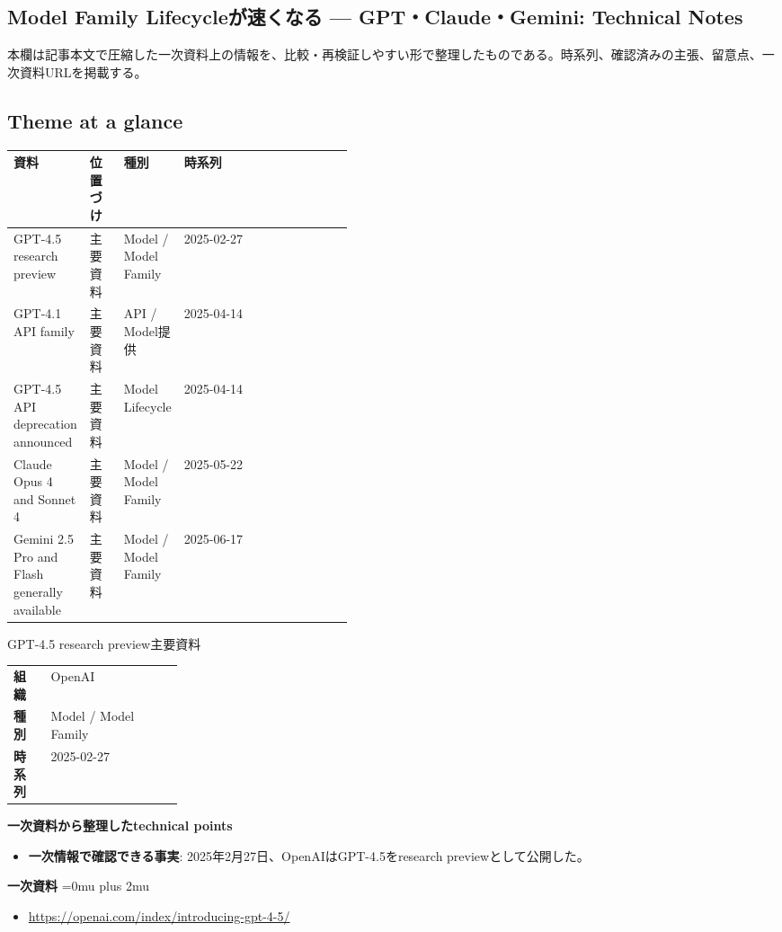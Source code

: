 \subsection*{Model Family Lifecycleが速くなる — GPT・Claude・Gemini: Technical Notes}
本欄は記事本文で圧縮した一次資料上の情報を、比較・再検証しやすい形で整理したものである。時系列、確認済みの主張、留意点、一次資料URLを掲載する。
\medskip
\subsection*{Theme at a glance}
\begin{center}
\footnotesize
\begin{tabularx}{\linewidth}{@{}p{0.20\linewidth}p{0.10\linewidth}p{0.14\linewidth}X@{}}
\toprule
資料 & 位置づけ & 種別 & 時系列 \\
\midrule
GPT-4.5 research preview & 主要資料 & Model / Model Family & 2025-02-27 \\
GPT-4.1 API family & 主要資料 & API / Model提供 & 2025-04-14 \\
GPT-4.5 API deprecation announced & 主要資料 & Model Lifecycle & 2025-04-14 \\
Claude Opus 4 and Sonnet 4 & 主要資料 & Model / Model Family & 2025-05-22 \\
Gemini 2.5 Pro and Flash generally available & 主要資料 & Model / Model Family & 2025-06-17 \\
\bottomrule
\end{tabularx}
\end{center}
\normalsize

\begin{technicalnote}{GPT-4.5 research preview}{主要資料}
\begingroup
\begin{tabularx}{\linewidth}{@{}>{\bfseries}p{0.22\linewidth}X@{}}
組織 & OpenAI \\
種別 & Model / Model Family \\
時系列 & 2025-02-27 \\
\end{tabularx}
\smallskip
{\bfseries 一次資料から整理したtechnical points}
\begin{itemize}[leftmargin=1.5em,itemsep=0.35em]
\item \textbf{一次情報で確認できる事実}: 2025年2月27日、OpenAIはGPT-4.5をresearch previewとして公開した。
\end{itemize}
\begin{samepage}
{\bfseries 一次資料}
\begingroup\sloppy
\Urlmuskip=0mu plus 2mu\relax
\begin{itemize}[leftmargin=1.5em,itemsep=0.25em]
\item {\scriptsize\url{https://openai.com/index/introducing-gpt-4-5/}}
\end{itemize}
\endgroup
\end{samepage}
\endgroup
\end{technicalnote}
\medskip

